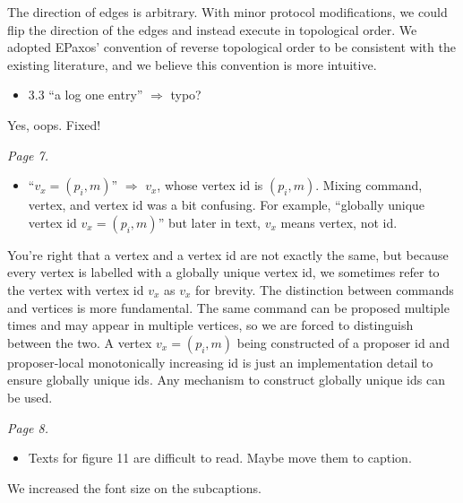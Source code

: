 \documentclass[letterpaper,twocolumn,10pt]{article}
\newenvironment{reviewerquote}
{\list{}{\leftmargin=\parindent\rightmargin=0in}\item[] \itshape \color{ReviewerDarkGray}}%
{\endlist}
\begin{document}
The direction of edges is arbitrary. With minor protocol modifications, we
could flip the direction of the edges and instead execute in topological order.
We adopted EPaxos' convention of reverse topological order to be consistent
with the existing literature, and we believe this convention is more intuitive.

\begin{reviewerquote}
  \begin{itemize}
    \item
      3.3 ``a log one entry'' $\Rightarrow$ typo?
  \end{itemize}
\end{reviewerquote}

Yes, oops. Fixed!

\begin{reviewerquote}
  Page 7.

  \begin{itemize}
    \item
      ``$v_x = (p_i, m)$'' $\Rightarrow$ $v_x$, whose vertex id is $(p_i, m)$.
      Mixing command, vertex, and vertex id was a bit confusing. For example,
      ``globally unique vertex id $v_x = (p_i, m)$'' but later in text, $v_x$
      means vertex, not id.
  \end{itemize}
\end{reviewerquote}

You're right that a vertex and a vertex id are not exactly the same, but
because every vertex is labelled with a globally unique vertex id, we sometimes
refer to the vertex with vertex id $v_x$ as $v_x$ for brevity. The distinction
between commands and vertices is more fundamental. The same command can be
proposed multiple times and may appear in multiple vertices, so we are forced
to distinguish between the two. A vertex $v_x = (p_i, m)$ being constructed of
a proposer id and proposer-local monotonically increasing id is just an
implementation detail to ensure globally unique ids. Any mechanism to construct
globally unique ids can be used.

\begin{reviewerquote}
  Page 8.

  \begin{itemize}
    \item
      Texts for figure 11 are difficult to read. Maybe move them to caption.
  \end{itemize}
\end{reviewerquote}

We increased the font size on the subcaptions.
\end{document}
